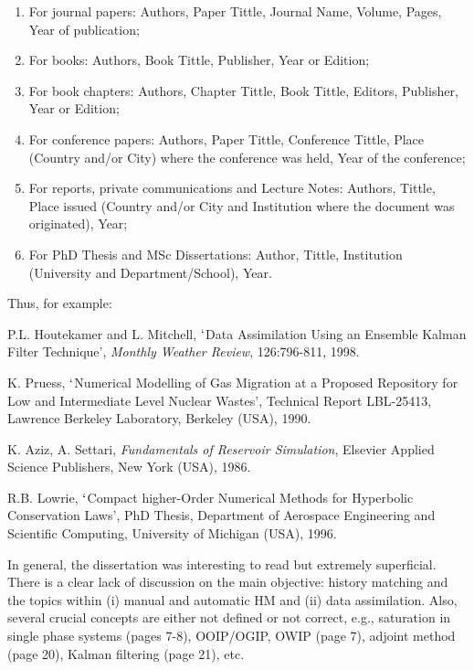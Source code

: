 \documentclass[14pt,twoside]{report}
\begin{document}
\begin{enumerate}
\begin{enumerate}
\item For journal papers: Authors, Paper Tittle, Journal Name, Volume, Pages, Year of publication;
\item For books: Authors, Book Tittle, Publisher, Year or Edition;
\item For book chapters: Authors, Chapter Tittle, Book Tittle, Editors, Publisher, Year or Edition;
\item For conference papers: Authors, Paper Tittle, Conference Tittle, Place (Country and/or City) where the conference was held, Year of the conference;
\item For reports,  private communications and Lecture Notes: Authors, Tittle, Place issued (Country and/or City and Institution where the document was originated), Year;
\item For PhD Thesis and MSc Dissertations: Author, Tittle, Institution (University and Department/School), Year.
\end{enumerate}  
Thus, for example:
\begin{enumerate}[label={[\arabic*]}]
\item P.L. Houtekamer and L. Mitchell, $\lq$Data Assimilation Using an Ensemble Kalman Filter Technique', {\it Monthly Weather Review}, 126:796-811, 1998.
\item K. Pruess, $\lq$Numerical Modelling of Gas Migration at a Proposed Repository for Low and Intermediate Level Nuclear Wastes', Technical Report LBL-25413, Lawrence Berkeley Laboratory, Berkeley (USA), 1990.
\item K. Aziz, A. Settari, {\it Fundamentals of Reservoir Simulation}, Elsevier Applied Science Publishers, New York (USA), 1986.
\item R.B. Lowrie, $\lq$Compact higher-Order Numerical Methods for Hyperbolic Conservation Laws', PhD Thesis, Department of Aerospace Engineering and Scientific Computing, University of Michigan (USA), 1996.
\end{enumerate} 
% 
\end{enumerate}

In general, the dissertation was interesting to read but extremely superficial. There is a clear lack of discussion on the main objective: history matching and the topics within (i) manual and automatic HM and (ii) data assimilation. Also, several crucial concepts are either not defined or not correct, e.g., saturation in single phase systems (pages 7-8), OOIP/OGIP, OWIP (page 7), adjoint method (page 20), Kalman filtering (page 21), etc.
\end{document}
